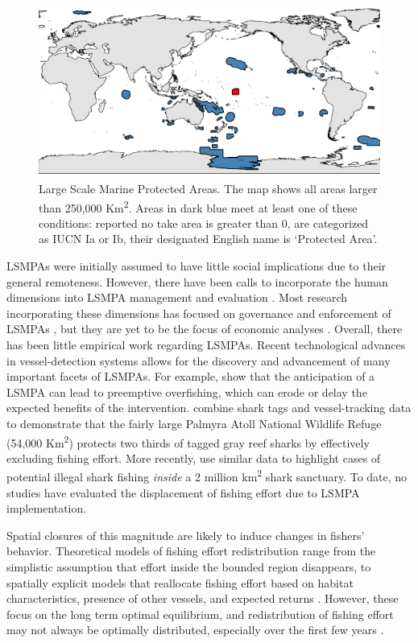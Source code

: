 \documentclass[9p,twocolumn,twoside,lineno]{pnas-new}
\begin{document}
\begin{figure}
\centering
\includegraphics{img/LSMPAs_map.pdf}
\caption{\label{fig:LSMPAs_map}Large Scale Marine
Protected Areas. The map shows all areas larger than 250,000
Km\textsuperscript{2}. Areas in dark blue meet at least one of these
conditions: reported no take area is greater than 0, are categorized as
IUCN Ia or Ib, their designated English name is `Protected Area'.}
\end{figure}

LSMPAs were initially assumed to have little social implications due
to their general remoteness. However, there have been calls to incorporate the
human dimensions into LSMPA management and evaluation
\citep{agardy_2011,gray_2017}. Most research incorporating these
dimensions has focused on governance and enforcement of LSMPAs
\cite{alger_2017,christie_2017}, but they are yet to be
the focus of economic analyses \citep{gray_2017}. Overall, there has
been little empirical work regarding LSMPAs. Recent technological
advances in vessel-detection systems allows for the discovery and
advancement of many important facets of LSMPAs. For example,
\cite{mcdermott_2018} show that the anticipation of a LSMPA can lead to
preemptive overfishing, which can erode or delay the expected benefits
of the intervention. \cite{white_2017} combine shark tags and
vessel-tracking data to demonstrate that the fairly large Palmyra Atoll
National Wildlife Refuge (54,000 Km\textsuperscript{2}) protects two
thirds of tagged gray reef sharks by effectively excluding fishing
effort. More recently, \citep{bradley_2018} use similar data to
highlight cases of potential illegal shark fishing \emph{inside} a 2
million km\textsuperscript{2} shark sanctuary. To date, no studies have
evaluated the displacement of fishing effort due to LSMPA
implementation.

Spatial closures of this magnitude are likely to induce changes in
fishers' behavior. Theoretical models of fishing effort redistribution
range from the simplistic assumption that effort inside the bounded
region disappears, to spatially explicit models that reallocate fishing
effort based on habitat characteristics, presence of other vessels, and
expected returns \citep{smith_2003,hilborn_2006}. However, these focus
on the long term optimal equilibrium, and redistribution of fishing
effort may not always be optimally distributed, especially over the first few years
\citep{stevenson_2013}.
\end{document}
